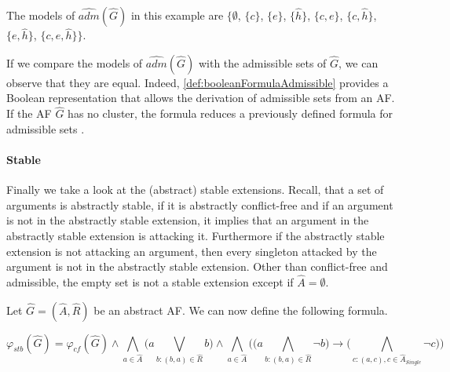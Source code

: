 \begin{example}
The models of $\hat{adm}(\hat{G})$ in this example are $\big\{\emptyset$, $\{c\}$, $\{e\}$, $\{\hat{h}\}$, $\{c, e\}$, $\{c, \hat{h}\}$, $\{e, \hat{h}\}$, $\{c, e, \hat{h}\} \big\}$.
\end{example}

If we compare the models of $ \hat{adm}(\hat{G})$ with the admissible sets of $\hat{G}$, we can observe that they are equal. Indeed, \cref{def:booleanFormulaAdmissible} provides a Boolean representation that allows the derivation of admissible sets from an AF. If the AF $\hat{G}$ has no cluster, the formula reduces a previously defined formula for admissible sets \cite{inproceedingsBesnardDoutreBooleanFormulaSemantics}.



\paragraph{Stable} Finally we take a look at the (abstract) stable extensions. Recall, that a set of arguments is abstractly stable, if it is abstractly conflict-free and if an
argument is not in the abstractly stable extension, it implies that an argument in the
abstractly stable extension is attacking it. Furthermore if the abstractly stable extension
is not attacking an argument, then every singleton attacked by the argument is not in the
abstractly stable extension. Other than conflict-free and admissible, the empty set is not a stable extension except if $\hat{A} = \emptyset$.

\begin{definition}
    Let $\hat{G}=(\hat{A},\hat{R})$ be an abstract AF. We can now define the following formula.
    \begin{center}
        \[ \varphi_{stb}(\hat{G}) =
        \varphi_{cf}(\hat{G}) \land \bigwedge_{a \in \hat{A}} \big( a \bigvee_{b:(b,a)\in \hat{R}} b\big) \land \bigwedge_{a \in \hat{A}} \big( \big(  a \bigwedge_{b:(b,a) \in \hat{R}} \lnot b\big)  \rightarrow \big( \bigwedge_{c:(a,c), c \in \hat{A}_{\mathit{Single}}} \lnot c\big) \big)
        \]
    \end{center}
    \label{def:booleanFormulaStable}
\end{definition}


